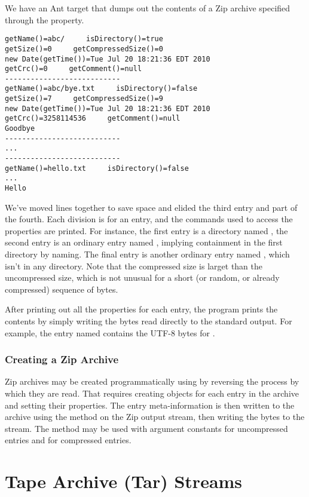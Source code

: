 We have an Ant target  that dumps out
the contents of a Zip archive specified through the
 property.
%
\begin{verbatim}
getName()=abc/     isDirectory()=true
getSize()=0     getCompressedSize()=0
new Date(getTime())=Tue Jul 20 18:21:36 EDT 2010
getCrc()=0     getComment()=null
---------------------------
getName()=abc/bye.txt     isDirectory()=false
getSize()=7     getCompressedSize()=9
new Date(getTime())=Tue Jul 20 18:21:36 EDT 2010
getCrc()=3258114536     getComment()=null
Goodbye
---------------------------
...
---------------------------
getName()=hello.txt     isDirectory()=false     
...
Hello
\end{verbatim}
%
We've moved lines together to save space and elided the third entry
and part of the fourth.  Each division is for an entry, and the
commands used to access the properties are printed.  For instance, the
first entry is a directory named , the second entry is an
ordinary entry named , implying containment in the
first directory by naming.  The final entry is another ordinary entry
named , which isn't in any directory.  Note that the
compressed size is larget than the uncompressed size, which is not
unusual for a short (or random, or already compressed) sequence of
bytes.

After printing out all the properties for each entry, the program
prints the contents by simply writing the bytes read directly to the
standard output.  For example, the entry named 
contains the UTF-8 bytes for .


\subsubsection{Creating a Zip Archive}

Zip archives may be created programmatically using
 by reversing the process by which they are
read.  That requires creating  objects for each entry
in the archive and setting their properties.  The entry
meta-information is then written to the archive using the
 method on the Zip output stream, then writing
the bytes to the stream.  The method  may be used
with argument constants  for uncompressed entries
and  for compressed entries.


\section{Tape Archive (Tar) Streams}\label{section:io-tar}

